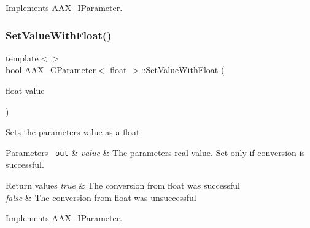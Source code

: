 Implements \mbox{\hyperlink{a01857_aa2b8cfdd30ff25e47c4c2a8609d1e06f}{A\+A\+X\+\_\+\+I\+Parameter}}.

\mbox{\label{a01537_aa06c3f670310e2022c89385b354fc2c8}} 
\subsubsection{\texorpdfstring{SetValueWithFloat()}{SetValueWithFloat()}\hspace{0.1cm}{\footnotesize\ttfamily [2/2]}}
{\footnotesize\ttfamily template$<$$>$ \\
bool \mbox{\hyperlink{a01537}{A\+A\+X\+\_\+\+C\+Parameter}}$<$ float $>$\+::Set\+Value\+With\+Float (\begin{DoxyParamCaption}\item[{float}]{value }\end{DoxyParamCaption})\hspace{0.3cm}{\ttfamily [virtual]}}



Sets the parameter\textquotesingle{}s value as a float. 


\begin{DoxyParams}[1]{Parameters}
\mbox{\texttt{ out}}  & {\em value} & The parameter\textquotesingle{}s real value. Set only if conversion is successful.\\
\hline
\end{DoxyParams}

\begin{DoxyRetVals}{Return values}
{\em true} & The conversion from float was successful \\
\hline
{\em false} & The conversion from float was unsuccessful \\
\hline
\end{DoxyRetVals}


Implements \mbox{\hyperlink{a01857_a1d37b80bc3a9c4e53fc2c1684f47dfb7}{A\+A\+X\+\_\+\+I\+Parameter}}.

\mbox{\label{a01537_af33746072bc8c5dd950fce15f81d1e4c}} 
